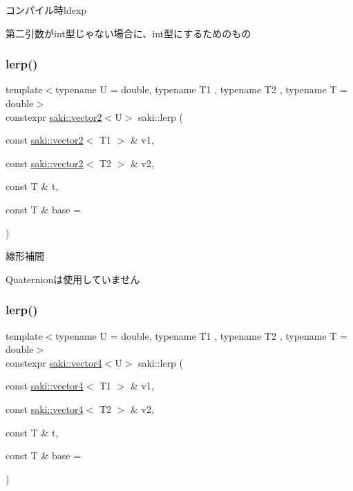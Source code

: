 コンパイル時ldexp 

第二引数がint型じゃない場合に、int型にするためのもの \mbox{\label{namespacesaki_aca2e4449261f40ee6f47abc49844e66c}} 
\subsubsection{\texorpdfstring{lerp()}{lerp()}\hspace{0.1cm}{\footnotesize\ttfamily [1/3]}}
{\footnotesize\ttfamily template$<$typename U  = double, typename T1 , typename T2 , typename T  = double$>$ \\
constexpr \mbox{\hyperlink{classsaki_1_1vector2}{saki\+::vector2}}$<$U$>$ saki\+::lerp (\begin{DoxyParamCaption}\item[{const \mbox{\hyperlink{classsaki_1_1vector2}{saki\+::vector2}}$<$ T1 $>$ \&}]{v1,  }\item[{const \mbox{\hyperlink{classsaki_1_1vector2}{saki\+::vector2}}$<$ T2 $>$ \&}]{v2,  }\item[{const T \&}]{t,  }\item[{const T \&}]{base = {} }\end{DoxyParamCaption})}



線形補間 

Quaternionは使用していません \mbox{\label{namespacesaki_acc3cd6d8e07cbfcd2691c4d9ffe25416}} 
\subsubsection{\texorpdfstring{lerp()}{lerp()}\hspace{0.1cm}{\footnotesize\ttfamily [2/3]}}
{\footnotesize\ttfamily template$<$typename U  = double, typename T1 , typename T2 , typename T  = double$>$ \\
constexpr \mbox{\hyperlink{classsaki_1_1vector4}{saki\+::vector4}}$<$U$>$ saki\+::lerp (\begin{DoxyParamCaption}\item[{const \mbox{\hyperlink{classsaki_1_1vector4}{saki\+::vector4}}$<$ T1 $>$ \&}]{v1,  }\item[{const \mbox{\hyperlink{classsaki_1_1vector4}{saki\+::vector4}}$<$ T2 $>$ \&}]{v2,  }\item[{const T \&}]{t,  }\item[{const T \&}]{base = {} }\end{DoxyParamCaption})}



